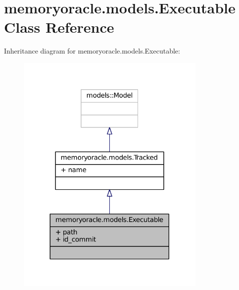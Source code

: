 \hypertarget{classmemoryoracle_1_1models_1_1Executable}{}\section{memoryoracle.\+models.\+Executable Class Reference}
\label{classmemoryoracle_1_1models_1_1Executable}


Inheritance diagram for memoryoracle.\+models.\+Executable\+:\nopagebreak
\begin{figure}[H]
\begin{center}
\leavevmode
\includegraphics[width=260pt]{classmemoryoracle_1_1models_1_1Executable__inherit__graph}
\end{center}
\end{figure}


